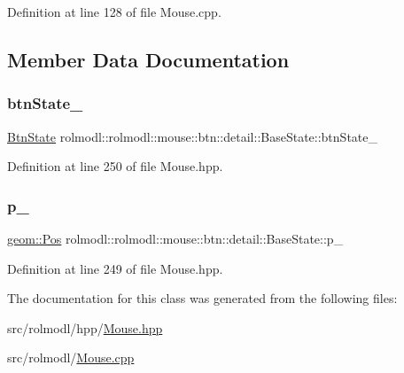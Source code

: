 Definition at line 128 of file Mouse.\+cpp.



\subsection{Member Data Documentation}
\mbox{\label{classrolmodl_1_1rolmodl_1_1mouse_1_1btn_1_1detail_1_1_base_state_aa8ce7e7fa32d84f4db1f2c2673867d71}} 
\subsubsection{\texorpdfstring{btnState\_}{btnState\_}}
{\footnotesize\ttfamily \mbox{\hyperlink{structrolmodl_1_1rolmodl_1_1mouse_1_1btn_1_1_btn_state}{Btn\+State}} rolmodl\+::rolmodl\+::mouse\+::btn\+::detail\+::\+Base\+State\+::btn\+State\+\_\+\hspace{0.3cm}{\ttfamily [protected]}}



Definition at line 250 of file Mouse.\+hpp.

\mbox{\label{classrolmodl_1_1rolmodl_1_1mouse_1_1btn_1_1detail_1_1_base_state_abf34f726271f596964afd6a46c3a3ba0}} 
\subsubsection{\texorpdfstring{p\_}{p\_}}
{\footnotesize\ttfamily \mbox{\hyperlink{structrolmodl_1_1geom_1_1_pos}{geom\+::\+Pos}} rolmodl\+::rolmodl\+::mouse\+::btn\+::detail\+::\+Base\+State\+::p\+\_\+\hspace{0.3cm}{\ttfamily [protected]}}



Definition at line 249 of file Mouse.\+hpp.



The documentation for this class was generated from the following files\+:\begin{DoxyCompactItemize}
\item 
src/rolmodl/hpp/\mbox{\hyperlink{_mouse_8hpp}{Mouse.\+hpp}}\item 
src/rolmodl/\mbox{\hyperlink{_mouse_8cpp}{Mouse.\+cpp}}\end{DoxyCompactItemize}

